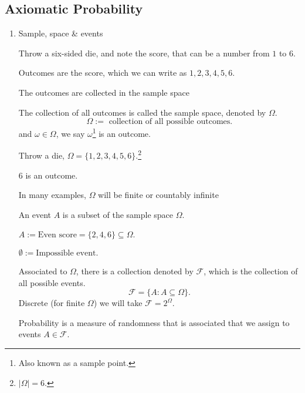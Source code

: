 \documentclass[10pt, a4paper]{article}
\begin{document}
\subsection{Axiomatic Probability}
\begin{enumerate}[label = (\roman*)]
    \item Sample, space \& events

    Throw a  six-sided die, and note the score, that can be a number from $1$ to $6$.

    Outcomes are the score, which we can write as $1, 2, 3, 4, 5, 6$.

    The outcomes are collected in the sample space
    \begin{definition}
        The collection of all outcomes is called the sample space, denoted by $\Omega$.
        \[
        \Omega := \text{ collection of all possible outcomes}.
        \]
        and $\omega \in \Omega$, we say $\omega$\footnote{Also known as a sample point.} is an outcome.
    \end{definition}
    \begin{example}\phantom{}
    
        Throw a die, $\Omega = \{1, 2, 3, 4, 5, 6\}$.\footnote{$|\Omega| = 6$.}

        $6$ is an outcome.
    \end{example}

    In many examples, $\Omega$ will be finite or countably infinite

    \begin{definition}[Event]
        An event $A$ is a subset of the sample space $\Omega$.
    \end{definition}
    \begin{example} \phantom{}
    
        $A := \text{Even score} = \{2, 4, 6\} \subseteq \Omega$.

        $\emptyset := \text{Impossible event}.$ 
    \end{example}

    \begin{definition}[Probability]
        Associated to $\Omega$, there is a collection denoted by $\mathcal{F}$, which is the collection of all possible events.
        \[
        \mathcal{F} = \{A : A \subseteq \Omega\}.
        \]
        Discrete (for finite $\Omega$) we will take $\mathcal{F} = 2 ^ \Omega$.

        Probability is a measure of randomness that is associated that we assign to events $A \in \mathcal{F}$.
    \end{definition}
\end{enumerate}
\end{document}
